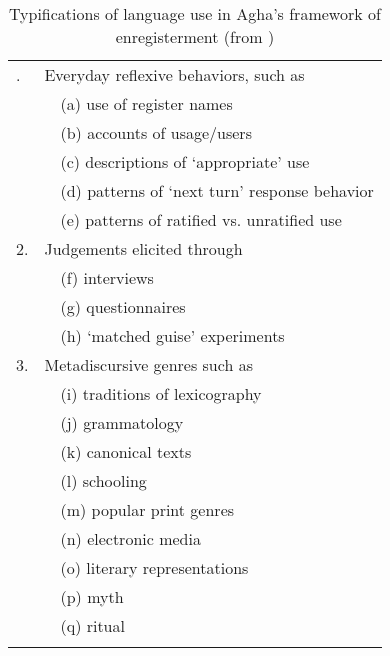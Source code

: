 \begin{table}
\begin{tabularx}{\textwidth}{R{2.5cm}l}

. & Everyday reflexive behaviors, such as\\
& ~~(a) use of register names\\
& ~~(b) accounts of usage/users\\
& ~~(c) descriptions of ‘appropriate’ use\\
& ~~(d) patterns of ‘next turn’ response behavior\\
& ~~(e) patterns of ratified vs. unratified use\\
 2. & Judgements elicited through\\
& ~~(f) interviews\\
& ~~(g) questionnaires\\
& ~~(h) ‘matched guise’ experiments\\
 3. & Metadiscursive genres such as\\
& ~~(i) traditions of lexicography\\
& ~~(j) grammatology\\
& ~~(k) canonical texts\\
& ~~(l) schooling\\
& ~~(m) popular print genres\\
& ~~(n) electronic media\\
& ~~(o) literary representations\\
& ~~(p) myth\\
& ~~(q) ritual\\
\lspbottomrule
\end{tabularx}
\caption{
Typifications of language use in Agha's framework of enregisterment (from \citealt[151]{Agha2007})
}
\label{tab:2:2}\label{tab:key:2}
\end{table}

